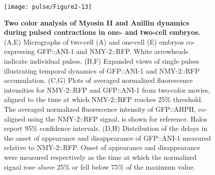 \begin{figure}[!htbp]
\centering
\texttt{[image: pulse/Figure2-13]}

\caption[Two color analysis of Myosin II and Anillin dynamics during pulsed contractions in one- and two-cell embryos.]{ \label{fig:2213} \textbf{Two color analysis of Myosin II and Anillin dynamics during pulsed contractions in one- and two-cell embryos.}(A,E) Micrographs of two-cell (A) and one-cell (E) embryos co-expressing GFP::ANI-1 and NMY-2::RFP. White arrowheads indicate individual pulses. (B,F) Expanded views of single pulses illustrating temporal dynamics of GFP::ANI-1 and NMY-2::RFP accumulation. (C,G) Plots of averaged normalized fluorescence intensities for NMY-2::RFP and GFP::ANI-1 from two-color movies, aligned to the time at which NMY-2::RFP reaches 25$\%$ threshold. The averaged normalized fluorescence intensity of GFP::AHPH, co-aligned using the NMY-2::RFP signal, is shown for reference. Halos report 95$\%$ confidence intervals. (D,H) Distribution of the delays in the onset of appearance and disappearance of GFP::ANI-1 measured relative to NMY-2::RFP.  Onset of appearance and disappearance were measured respectively as the time at which the normalized signal rose above 25$\%$ or fell below 75$\%$ of the maximum value. }
\end{figure}




